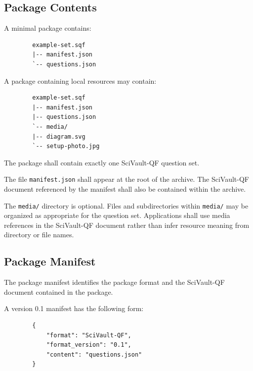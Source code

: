\documentclass[11pt]{article}
\begin{document}
	\subsection{Package Contents}
	
	A minimal package contains:
	
	\begin{lstlisting}
		example-set.sqf
		|-- manifest.json
		`-- questions.json
	\end{lstlisting}
	
	A package containing local resources may contain:
	
	\begin{lstlisting}
		example-set.sqf
		|-- manifest.json
		|-- questions.json
		`-- media/
		|-- diagram.svg
		`-- setup-photo.jpg
	\end{lstlisting}
	
	The package shall contain exactly one SciVault-QF question set.
	
	The file \texttt{manifest.json} shall appear at the root of the archive.
	The SciVault-QF document referenced by the manifest shall also be contained
	within the archive.
	
	The \texttt{media/} directory is optional. Files and subdirectories within
	\texttt{media/} may be organized as appropriate for the question set.
	Applications shall use media references in the SciVault-QF document rather
	than infer resource meaning from directory or file names.
	
	\subsection{Package Manifest}
	
	The package manifest identifies the package format and the SciVault-QF
	document contained in the package.
	
	A version 0.1 manifest has the following form:
	
	\begin{lstlisting}
		{
			"format": "SciVault-QF",
			"format_version": "0.1",
			"content": "questions.json"
		}
	\end{lstlisting}
	
\end{document}
